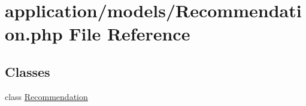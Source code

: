 \hypertarget{_recommendation_8php}{\section{application/models/\-Recommendation.php File Reference}
\label{_recommendation_8php}
}
\subsection*{Classes}
\begin{DoxyCompactItemize}
\item 
class \hyperlink{class_recommendation}{Recommendation}
\end{DoxyCompactItemize}
